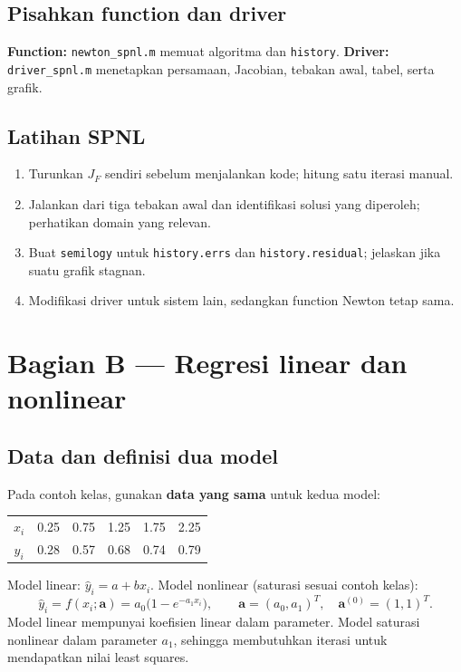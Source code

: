 \subsection{Pisahkan function dan driver}
\textbf{Function:} \texttt{newton\_spnl.m} memuat algoritma dan \texttt{history}. \textbf{Driver:} \texttt{driver\_spnl.m} menetapkan persamaan, Jacobian, tebakan awal, tabel, serta grafik.



\subsection{Latihan SPNL}
\begin{enumerate}
\item Turunkan $J_F$ sendiri sebelum menjalankan kode; hitung satu iterasi manual.
\item Jalankan dari tiga tebakan awal dan identifikasi solusi yang diperoleh; perhatikan domain yang relevan.
\item Buat \texttt{semilogy} untuk \texttt{history.errs} dan \texttt{history.residual}; jelaskan jika suatu grafik stagnan.
\item Modifikasi driver untuk sistem lain, sedangkan function Newton tetap sama.
\end{enumerate}

\section{Bagian B --- Regresi linear dan nonlinear}
\subsection{Data dan definisi dua model}
Pada contoh kelas, gunakan \textbf{data yang sama} untuk kedua model:
\begin{center}
\begin{tabular}{c|ccccc}\hline
$x_i$&0.25&0.75&1.25&1.75&2.25\\
$y_i$&0.28&0.57&0.68&0.74&0.79\\\hline
\end{tabular}
\end{center}
Model linear: $\widehat y_i=a+b x_i$. Model nonlinear (saturasi sesuai contoh kelas):
\begin{equation}
\widehat y_i=f(x_i;\mathbf{a})=a_0\bigl(1-e^{-a_1x_i}\bigr),
\qquad \mathbf{a}=(a_0,a_1)^T,\quad \mathbf{a}^{(0)}=(1,1)^T.
\label{eq:model_saturasi}
\end{equation}
Model linear mempunyai koefisien linear dalam parameter. Model saturasi nonlinear dalam parameter $a_1$, sehingga membutuhkan iterasi untuk mendapatkan nilai least squares.

